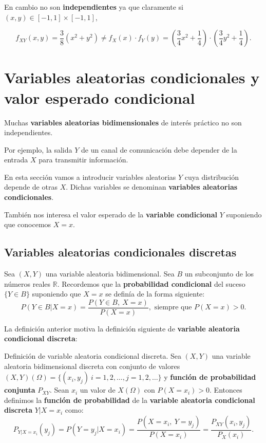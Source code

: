 \documentclass[]{book}
\begin{document}
En cambio no son \textbf{independientes} ya que claramente si \((x,y)\in [-1,1]\times [-1,1]\),

\[
f_{XY}(x,y)=\frac{3}{8}(x^2+y^2) \neq f_X(x)\cdot f_Y(y)=\left(\frac{3}{4} x^2+\frac{1}{4}\right)\cdot \left(\frac{3}{4} y^2+\frac{1}{4}\right).
\]

\hypertarget{variables-aleatorias-condicionales-y-valor-esperado-condicional}{%
\section{Variables aleatorias condicionales y valor esperado condicional}\label{variables-aleatorias-condicionales-y-valor-esperado-condicional}}

Muchas \textbf{variables aleatorias bidimensionales} de interés práctico no son independientes.

Por ejemplo, la salida \(Y\) de un canal de comunicación debe depender de la entrada \(X\) para transmitir información.

En esta sección vamos a introducir variables aleatorias \(Y\) cuya distribución depende de otras \(X\). Dichas variables se denominan \textbf{variables aleatorias condicionales}.

También nos interesa el valor esperado de la \textbf{variable condicional} \(Y\) suponiendo que conocemos \(X=x\).

\hypertarget{variables-aleatorias-condicionales-discretas}{%
\subsection{Variables aleatorias condicionales discretas}\label{variables-aleatorias-condicionales-discretas}}

Sea \((X,Y)\) una variable aleatoria bidimensional. Sea \(B\) un subconjunto de los números reales \(\mathbb{R}\). Recordemos que la \textbf{probabilidad condicional} del suceso \(\{Y\in B\}\) suponiendo que \(X=x\) se definía de la forma siguiente:
\[
P(Y\in B|X=x)=\frac{P(Y\in B,\ X=x)}{P(X=x)}, \mbox{ siempre que }P(X=x)>0.
\]

La definición anterior motiva la definición siguiente de \textbf{variable aleatoria condicional discreta}:

Definición de variable aleatoria condicional discreta.
Sea \((X,Y)\) una variable aleatoria bidimensional discreta con conjunto de valores \((X,Y)(\Omega)=\{(x_i,y_j)\ i=1,2,\ldots, j=1,2,\ldots\}\) y \textbf{función de probabilidad conjunta} \(P_{XY}\). Sean \(x_i\) un valor de \(X(\Omega)\) con \(P(X=x_i)>0\). Entonces definimos la \textbf{función de probabilidad} de la \textbf{variable aleatoria condicional discreta} \(Y|X=x_i\) como:
\[
P_{Y|X=x_i}(y_j)=P(Y=y_j|X=x_i)=\frac{P(X=x_i,\ Y=y_j)}{P(X=x_i)}=\frac{P_{XY}(x_i,y_j)}{P_X(x_i)}.
\]
\end{document}
